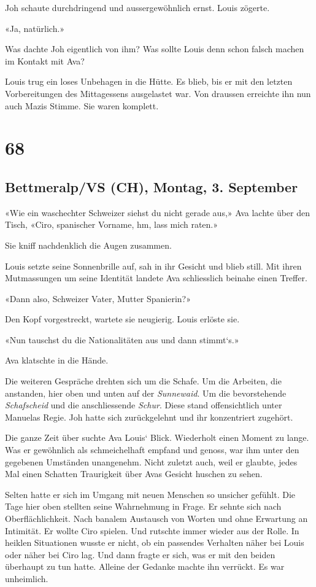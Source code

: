Joh schaute durchdringend und aussergewöhnlich ernst. Louis zögerte.

«Ja, natürlich.»

Was dachte Joh eigentlich von ihm? Was sollte Louis denn schon falsch
machen im Kontakt mit Ava?

Louis trug ein loses Unbehagen in die Hütte. Es blieb, bis er mit den
letzten Vorbereitungen des Mittagessens ausgelastet war. Von draussen
erreichte ihn nun auch Mazis Stimme. Sie waren komplett.

\chapter{68}\label{section-68}

\section{Bettmeralp/VS (CH), Montag, 3.
September}\label{bettmeralpvs-ch-montag-3.-september}

«Wie ein waschechter Schweizer siehst du nicht gerade aus,» Ava lachte
über den Tisch, «Ciro, spanischer Vorname, hm, lass mich raten.»

Sie kniff nachdenklich die Augen zusammen.

Louis setzte seine Sonnenbrille auf, sah in ihr Gesicht und blieb still.
Mit ihren Mutmassungen um seine Identität landete Ava schliesslich
beinahe einen Treffer.

«Dann also, Schweizer Vater, Mutter Spanierin?»

Den Kopf vorgestreckt, wartete sie neugierig. Louis erlöste sie.

«Nun tauschst du die Nationalitäten aus und dann stimmt`s.»

Ava klatschte in die Hände.

Die weiteren Gespräche drehten sich um die Schafe. Um die Arbeiten, die
anstanden, hier oben und unten auf der \emph{Sunnewaid}. Um die
bevorstehende \emph{Schafscheid} und die anschliessende \emph{Schur}.
Diese stand offensichtlich unter Manuelas Regie. Joh hatte sich
zurückgelehnt und ihr konzentriert zugehört.

Die ganze Zeit über suchte Ava Louis` Blick. Wiederholt einen Moment zu
lange. Was er gewöhnlich als schmeichelhaft empfand und genoss, war ihm
unter den gegebenen Umständen unangenehm. Nicht zuletzt auch, weil er
glaubte, jedes Mal einen Schatten Traurigkeit über Avas Gesicht huschen
zu sehen.

Selten hatte er sich im Umgang mit neuen Menschen so unsicher gefühlt.
Die Tage hier oben stellten seine Wahrnehmung in Frage. Er sehnte sich
nach Oberflächlichkeit. Nach banalem Austausch von Worten und ohne
Erwartung an Intimität. Er wollte Ciro spielen. Und rutschte immer
wieder aus der Rolle. In heiklen Situationen wusste er nicht, ob ein
passendes Verhalten näher bei Louis oder näher bei Ciro lag. Und dann
fragte er sich, was er mit den beiden überhaupt zu tun hatte. Alleine
der Gedanke machte ihn verrückt. Es war unheimlich.

